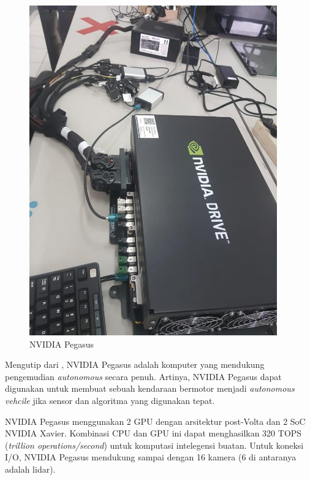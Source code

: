 \begin{figure}
    \begin{center}
        \includegraphics[height=0.5\textheight]{resources/chapter-2/pegasus.png}
        \caption{NVIDIA Pegasus \parencite{trilaksono_laporanRispro}}
    \end{center}
\end{figure}

Mengutip dari \parencite{oh_2017}, NVIDIA Pegasus adalah komputer yang
mendukung pengemudian \textit{autonomous} secara penuh. Artinya, NVIDIA Pegasus
dapat digunakan untuk membuat sebuah kendaraan bermotor menjadi
\textit{autonomous vehcile} jika sensor dan algoritma yang digunakan tepat.

NVIDIA Pegasus menggunakan 2 GPU dengan arsitektur post-Volta dan 2 SoC NVIDIA
Xavier. Kombinasi CPU dan GPU ini dapat menghasilkan 320 TOPS (\textit{trillion
    operations/second}) untuk komputasi intelegensi buatan. Untuk koneksi I/O,
NVIDIA Pegasus mendukung sampai dengan 16 kamera (6 di antaranya adalah lidar).


